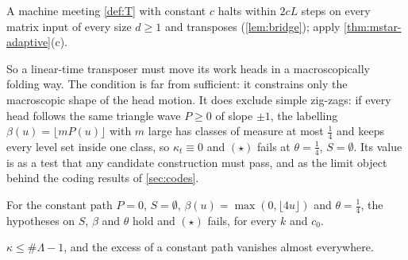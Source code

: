 \begin{outline}
A machine meeting \cref{def:T} with constant $c$ halts within $2cL$ steps on every matrix input of every
size $d\ge1$ and transposes (\cref{lem:bridge}); apply \cref{thm:mstar-adaptive}(c).
\end{outline}

So a linear-time transposer must move its work heads in a macroscopically folding way. The
condition is far from sufficient: it constrains only the macroscopic shape of the head motion. It does
exclude simple zig-zags: if every head follows the same triangle wave $P\ge0$ of slope $\pm1$, the labelling
$\beta(u)=\lfloor mP(u)\rfloor$ with $m$ large has classes of measure at most $\tfrac14$ and keeps every level
set inside one class, so $\kappa_t\equiv0$ and $(\star)$ fails at $\theta=\tfrac14$, $S=\emptyset$. Its value
is as a test that any candidate construction must pass, and as the limit object behind the coding results of
\cref{sec:codes}.

\begin{proposition}\label{prop:star-fails}
For the constant path $P=0$, $S=\emptyset$, $\beta(u)=\max(0,\lfloor4u\rfloor)$ and $\theta=\tfrac14$, the
hypotheses on $S$, $\beta$ and $\theta$ hold and $(\star)$ fails, for every $k$ and $c_0$.
\end{proposition}

\begin{outline}
$\kappa\le\#\Lambda-1$, and the excess of a constant path vanishes almost everywhere.
\end{outline}
